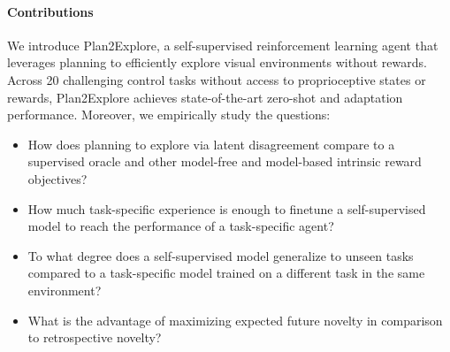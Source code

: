 \documentclass{article}
\begin{document}
\vspace{-0.09in}
\paragraph{Contributions}
We introduce Plan2Explore, a self-supervised reinforcement learning agent that leverages planning to efficiently explore visual environments without rewards. Across 20 challenging control tasks without access to proprioceptive states or rewards, Plan2Explore achieves state-of-the-art zero-shot and adaptation performance. Moreover, we empirically study the questions:
\begin{itemize}[noitemsep,topsep=0pt]
\item How does planning to explore via latent disagreement compare to a supervised oracle and other model-free and model-based intrinsic reward objectives?
\item How much task-specific experience is enough to finetune a self-supervised model to reach the performance of a task-specific agent?
\item To what degree does a self-supervised model generalize to unseen tasks compared to a task-specific model trained on a different task in the same environment?
\item What is the advantage of maximizing expected future novelty in comparison to retrospective novelty?
\end{itemize}

%
\end{document}
